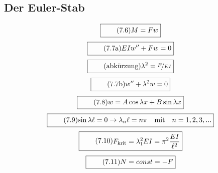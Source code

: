 \documentclass[11pt]{article}
\newcommand{\1}{ {\mathds{1}} }
\begin{document}
\begin{multicols}{2}
		\subsection{Der Euler-Stab}
		\begin{equation}
			\boxed{
				\tag{7.6}
				\begin{split}
					M = F w
				\end{split}
			}
		\end{equation}
		\begin{equation}
			\boxed{
				\tag{7.7a}
				\begin{split}
					EIw'' + Fw = 0
				\end{split}
			}
		\end{equation}
		\begin{equation}
			\boxed{
				\tag{abkürzung}
				\begin{split}
					\lambda^2 = \nicefrac{F}{EI}
				\end{split}
			}
		\end{equation}
		\begin{equation}
			\boxed{
				\tag{7.7b}
				\begin{split}
					w'' + \lambda^2w = 0
				\end{split}
			}
		\end{equation}
		\begin{equation}
			\boxed{
				\tag{7.8}
				\begin{split}
					w = A\cos \lambda x + B \sin \lambda x
				\end{split}
			}
		\end{equation}
		\begin{equation}
			\boxed{
				\tag{7.9}
				\begin{split}
					\sin \lambda \ell = 0 
					\rightarrow
					\lambda_n \ell = n \pi
					\quad \text{mit} \quad
					n = 1,2,3,...
				\end{split}
			}
		\end{equation}
		\begin{equation}
			\boxed{
				\tag{7.10}
				\begin{split}
					F_{\text{krit}} = \lambda^2_1 EI = \pi^2\frac{EI}{\ell^2}
				\end{split}
			}
		\end{equation}
		\begin{equation}
			\boxed{
				\tag{7.11}
				\begin{split}
					N = const = -F
				\end{split}
			}
		\end{equation}

\end{multicols}
\end{document}
